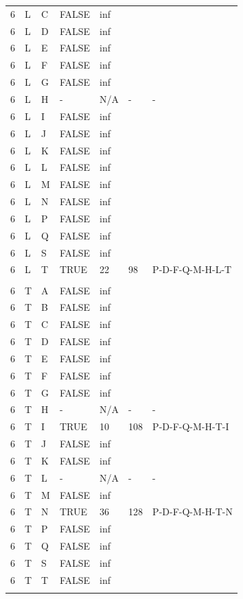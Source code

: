 \documentclass[11pt]{book}
\renewcommand{\=}[1]{\stackrel{#1}{=}} %
\theoremstyle{definition}
\theoremstyle{remark}
\begin{document}
\begin{longtable}{lllllll}
6 & L & C & FALSE & inf &  &  \\
6 & L & D & FALSE & inf &  &  \\
6 & L & E & FALSE & inf &  &  \\
6 & L & F & FALSE & inf &  &  \\
6 & L & G & FALSE & inf &  &  \\
6 & L & H & - & N/A & - & - \\
6 & L & I & FALSE & inf &  &  \\
6 & L & J & FALSE & inf &  &  \\
6 & L & K & FALSE & inf &  &  \\
6 & L & L & FALSE & inf &  &  \\
6 & L & M & FALSE & inf &  &  \\
6 & L & N & FALSE & inf &  &  \\
6 & L & P & FALSE & inf &  &  \\
6 & L & Q & FALSE & inf &  &  \\
6 & L & S & FALSE & inf &  &  \\
6 & L & T & TRUE & 22 & 98 & P-D-F-Q-M-H-L-T \\
 &  &  &  &  &  &  \\
6 & T & A & FALSE & inf &  &  \\
6 & T & B & FALSE & inf &  &  \\
6 & T & C & FALSE & inf &  &  \\
6 & T & D & FALSE & inf &  &  \\
6 & T & E & FALSE & inf &  &  \\
6 & T & F & FALSE & inf &  &  \\
6 & T & G & FALSE & inf &  &  \\
6 & T & H & - & N/A & - & - \\
6 & T & I & TRUE & 10 & 108 & P-D-F-Q-M-H-T-I \\
6 & T & J & FALSE & inf &  &  \\
6 & T & K & FALSE & inf &  &  \\
6 & T & L & - & N/A & - & - \\
6 & T & M & FALSE & inf &  &  \\
6 & T & N & TRUE & 36 & 128 & P-D-F-Q-M-H-T-N \\
6 & T & P & FALSE & inf &  &  \\
6 & T & Q & FALSE & inf &  &  \\
6 & T & S & FALSE & inf &  &  \\
6 & T & T & FALSE & inf &  &  \\
 &  &  &  &  &  &  \\

\end{longtable}
\end{document}
